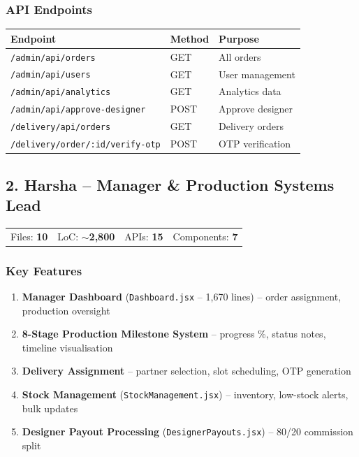 \documentclass[a4paper,11pt]{article}
\begin{document}
\subsubsection{API Endpoints}
\begin{tabular}{@{}L{5.5cm}L{4cm}L{3.5cm}@{}}
\toprule
{}
\textbf{Endpoint} & \textbf{Method} & \textbf{Purpose} \\
\midrule
\texttt{/admin/api/orders}              & GET  & All orders \\
\texttt{/admin/api/users}               & GET  & User management \\
\texttt{/admin/api/analytics}           & GET  & Analytics data \\
\texttt{/admin/api/approve-designer}    & POST & Approve designer \\
\texttt{/delivery/api/orders}           & GET  & Delivery orders \\
\texttt{/delivery/order/:id/verify-otp} & POST & OTP verification \\
\bottomrule
\end{tabular}

\subsection{\textcolor{harshaCol}{2. Harsha} -- Manager \& Production Systems Lead}

\begin{mdframed}[linecolor=harshaCol!60, backgroundcolor=harshaCol!5, roundcorner=4pt]
\begin{tabular}{@{}L{3cm}L{3cm}L{3cm}L{3cm}@{}}
  Files: \textbf{10} & LoC: \textbf{$\sim$2,800} & APIs: \textbf{15} & Components: \textbf{7}
\end{tabular}
\end{mdframed}

\subsubsection{Key Features}
\begin{enumerate}[noitemsep]
  \item \textbf{Manager Dashboard} (\texttt{Dashboard.jsx} -- 1,670 lines) -- order assignment, production oversight
  \item \textbf{8-Stage Production Milestone System} -- progress \%, status notes, timeline visualisation
  \item \textbf{Delivery Assignment} -- partner selection, slot scheduling, OTP generation
  \item \textbf{Stock Management} (\texttt{StockManagement.jsx}) -- inventory, low-stock alerts, bulk updates
  \item \textbf{Designer Payout Processing} (\texttt{DesignerPayouts.jsx}) -- 80/20 commission split
\end{enumerate}
\end{document}
